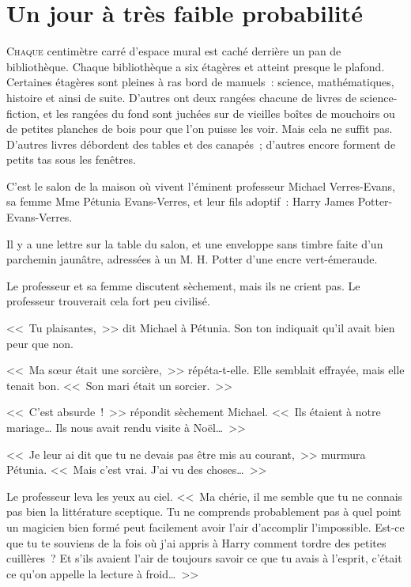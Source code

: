 \chapter{Un jour à très faible probabilité}

\lettrine{C}{haque} centimètre carré d'espace mural est caché derrière un pan de bibliothèque. Chaque bibliothèque a six étagères et atteint presque le
plafond. Certaines étagères sont pleines à ras bord de manuels~: science, mathématiques, histoire et ainsi de suite. D'autres ont deux rangées chacune de livres de science-fiction, et les rangées du fond sont juchées sur de vieilles boîtes de mouchoirs\footnotemark{} ou de petites planches de bois pour que l'on puisse les voir. Mais cela ne suffit pas. D'autres livres débordent des tables et des canapés~; d'autres encore forment de petits tas sous les fenêtres.

C'est le salon de la maison où vivent l'éminent professeur Michael Verres-Evans, sa femme Mme Pétunia Evans-Verres, et leur fils adoptif~: Harry James Potter-Evans-Verres.

Il y a une lettre sur la table du salon, et une enveloppe sans timbre faite d'un parchemin jaunâtre, adressées à un M. H. Potter d'une encre vert-émeraude.

Le professeur et sa femme discutent sèchement, mais ils ne crient pas. Le professeur trouverait cela fort peu civilisé.

<<~Tu plaisantes,~>> dit Michael à Pétunia. Son ton indiquait qu'il avait bien peur que non.

<<~Ma s\oe{}ur était une sorcière,~>> répéta-t-elle. Elle semblait effrayée, mais elle tenait bon. <<~Son mari était un sorcier.~>>

<<~C'est absurde~!~>> répondit sèchement Michael. <<~Ils étaient à notre mariage\ldots{} Ils nous avait rendu visite à Noël\ldots~>>

<<~Je leur ai dit que tu ne devais pas être mis au courant,~>> murmura Pétunia. <<~Mais c'est vrai. J'ai vu des choses\ldots~>>

Le professeur leva les yeux au ciel. <<~Ma chérie, il me semble que tu ne connais pas bien la littérature sceptique. Tu ne comprends probablement pas à quel point un magicien bien formé peut facilement avoir l'air d'accomplir l'impossible. Est-ce que tu te souviens de la fois où j'ai appris à Harry comment tordre des petites cuillères~? Et s'ils avaient l'air de toujours savoir ce que tu avais à l'esprit, c'était ce qu'on appelle la lecture à froid\ldots~>>


